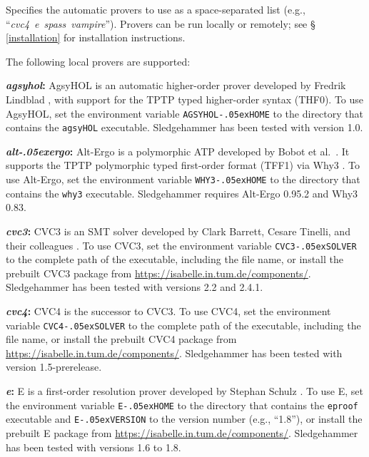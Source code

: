 \documentclass[a4paper,12pt]{article}
\newcommand\download{\url{https://isabelle.in.tum.de/components/}}
\let\oldS=\S
\def\S{\oldS\,}
\renewcommand\_{\hbox{\textunderscore\kern-.05ex}}
\begin{document}
\begin{enum}
Specifies the automatic provers to use as a space-separated list (e.g.,
``\textit{cvc4}~\textit{e}~\textit{spass}~\textit{vampire\/}'').
Provers can be run locally or remotely; see \S\ref{installation} for
installation instructions.

The following local provers are supported:

\begin{sloppy}
\begin{enum}
\item[\labelitemi] \textbf{\textit{agsyhol}:} AgsyHOL is an automatic
higher-order prover developed by Fredrik Lindblad \cite{agsyHOL},
with support for the TPTP typed higher-order syntax (THF0). To use AgsyHOL, set
the environment variable \texttt{AGSYHOL\_HOME} to the directory that contains
the \texttt{agsyHOL} executable. Sledgehammer has been tested with version 1.0.

\item[\labelitemi] \textbf{\textit{alt\_ergo}:} Alt-Ergo is a polymorphic
ATP developed by Bobot et al.\ \cite{alt-ergo}.
It supports the TPTP polymorphic typed first-order format (TFF1) via Why3
\cite{why3}. To use Alt-Ergo, set the environment variable \texttt{WHY3\_HOME}
to the directory that contains the \texttt{why3} executable. Sledgehammer
requires Alt-Ergo 0.95.2 and Why3 0.83.

\item[\labelitemi] \textbf{\textit{cvc3}:} CVC3 is an SMT solver developed by
Clark Barrett, Cesare Tinelli, and their colleagues \cite{cvc3}. To use CVC3,
set the environment variable \texttt{CVC3\_SOLVER} to the complete path of the
executable, including the file name, or install the prebuilt CVC3 package from
\download. Sledgehammer has been tested with versions 2.2 and 2.4.1.

\item[\labelitemi] \textbf{\textit{cvc4}:} CVC4 \cite{cvc4} is the successor to
CVC3. To use CVC4, set the environment variable \texttt{CVC4\_SOLVER} to the
complete path of the executable, including the file name, or install the
prebuilt CVC4 package from \download. Sledgehammer has been tested with version
1.5-prerelease.

\item[\labelitemi] \textbf{\textit{e}:} E is a first-order resolution prover
developed by Stephan Schulz \cite{schulz-2002}. To use E, set the environment
variable \texttt{E\_HOME} to the directory that contains the \texttt{eproof}
executable and \texttt{E\_VERSION} to the version number (e.g., ``1.8''), or
install the prebuilt E package from \download. Sledgehammer has been tested with
versions 1.6 to 1.8.


\end{enum}
\end{sloppy}
\end{enum}
\end{document}
